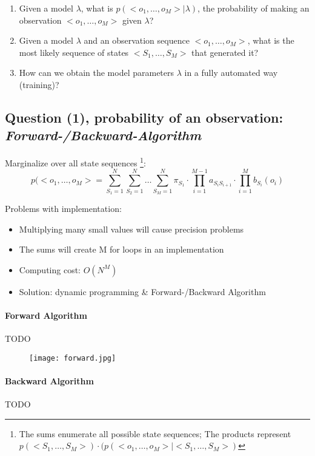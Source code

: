 \begin{enumerate}
	\item Given a model \(\lambda\), what is \(p(<o_1,\dots, o_M>|\lambda)\), the probability of making an observation \(<o_1,\dots, o_M>\) given \(\lambda\)?
	\item Given a model \(\lambda\) and an observation sequence \(<o_1,\dots, o_M>\), what is the most likely sequence of states \(<S_1,\dots, S_M>\) that generated it?
	\item How can we obtain the model parameters \(\lambda\) in a fully automated way (training)?
\end{enumerate}

\subsection*{Question (1), probability of an observation: \emph{Forward-/Backward-Algorithm}}

Marginalize over all state sequences \footnote{The sums enumerate all possible state sequences; The products represent \(p(<S_1,\dots,S_M>) \cdot (p(<o_1,\dots, o_M>|<S_1,\dots,S_M>)\)}:
\[p(<o_1,\dots,o_M> = \sum_{S_1=1}^{N} \sum_{S_2=1}^{N} \dots \sum_{S_M=1}^{N} \pi_{S_1} \cdot \prod_{i=1}^{M-1} a_{S_i S_{i+1}} \cdot \prod_{i=1}^{M} b_{S_i}(o_i)\]

Problems with implementation:
\begin{itemize}
	\item Multiplying many small values will cause precision problems
	\item The sums will create M for loops in an implementation
	\item Computing cost: \(O(N^M)\)
	\item Solution: dynamic programming \& Forward-/Backward Algorithm
\end{itemize}

\paragraph{Forward Algorithm} TODO

\begin{figure}[H]
	\centering
	\texttt{[image: forward.jpg]}
\end{figure}

\paragraph{Backward Algorithm} TODO

